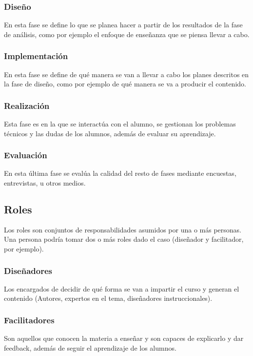 \subsubsection{Diseño}
En esta fase se define lo que se planea hacer a partir de los resultados de la fase de análisis, como por ejemplo el enfoque de enseñanza que se piensa llevar a cabo.

\subsubsection{Implementación}
En esta fase se define de qué manera se van a llevar a cabo los planes descritos en la fase de diseño, como por ejemplo de qué manera se va a producir el contenido.

\subsubsection{Realización}
Esta fase es en la que se interactúa con el alumno, se gestionan los problemas técnicos y las dudas de los alumnos, además de evaluar su aprendizaje.

\subsubsection{Evaluación}
En esta última fase se evalúa la calidad del resto de fases mediante encuestas, entrevistas, u otros medios.

\subsection{Roles}
Los roles son conjuntos de responsabilidades asumidos por una o más personas. Una persona podría tomar dos o más roles dado el caso (diseñador y facilitador, por ejemplo).
\subsubsection{Diseñadores}
Los encargados de decidir de qué forma se van a impartir el curso y generan el contenido (Autores, expertos en el tema, diseñadores instruccionales). 

\subsubsection{Facilitadores}
Son aquellos que conocen la materia a enseñar y son capaces de explicarlo y dar feedback, además de seguir el aprendizaje de los alumnos.

